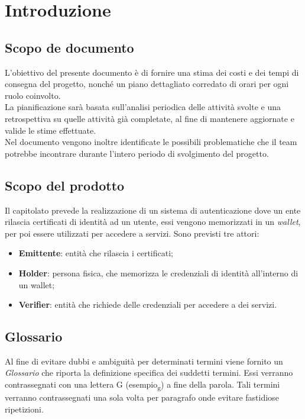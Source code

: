 \section{Introduzione}

\subsection{Scopo de documento}
L’obiettivo del presente documento è di fornire una stima dei costi e dei tempi di consegna del progetto, nonché un piano dettagliato corredato di orari per ogni ruolo coinvolto. \\
La pianificazione sarà basata sull’analisi periodica delle attività svolte e una retrospettiva su quelle attività già completate, al fine di mantenere aggiornate e valide le 
stime effettuate. \\ Nel documento vengono inoltre identificate le possibili problematiche che il team potrebbe incontrare durante l’intero periodo di svolgimento del progetto.

\subsection{Scopo del prodotto}
Il capitolato prevede la realizzazione di un sistema di autenticazione dove un ente rilascia certificati di identità ad un utente, essi vengono memorizzati in un \textit{wallet}, 
per poi essere utilizzati per accedere a servizi. Sono previsti tre attori:
\begin{itemize}
    \item \textbf{Emittente}: entità che rilascia i certificati;
    \item \textbf{Holder}: persona fisica, che memorizza le credenziali di identità all'interno di un wallet;
    \item \textbf{Verifier}: entità che richiede delle credenziali per accedere a dei servizi.
\end{itemize}

\subsection{Glossario}
Al fine di evitare dubbi e ambiguità per determinati termini viene fornito un \textit{Glossario} che riporta la definizione specifica dei suddetti termini. 
Essi verranno contrassegnati con una lettera G (esempio\textsubscript{g}) a fine della parola. 
Tali termini verranno contrassegnati una sola volta per paragrafo onde evitare fastidiose ripetizioni. 

